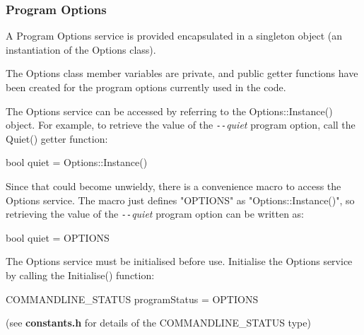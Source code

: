 \subsubsection{Program Options}\label{sec:Services_OPTIONS}

A Program Options service is provided encapsulated in a singleton object (an instantiation of the Options class).

The Options class member variables are private, and public getter functions have been created for the program options currently used in the code.

The Options service can be accessed by referring to the Options::Instance() object.  For example, to retrieve the value of the \textit{\texttt{-{}-}quiet} program option, call the Quiet() getter function:

\tabto{3em}bool quiet = Options::Instance()

\medskip
Since that could become unwieldy, there is a convenience macro to access the Options service.  The macro just defines "OPTIONS" as "Options::Instance()", so retrieving the value of the \textit{\texttt{-{}-}quiet} program option can be written as:

\tabto{3em}bool quiet = OPTIONS

\medskip
The Options service must be initialised before use.  Initialise the Options service by calling the Initialise() function:

\tabto{3em}COMMANDLINE\_STATUS programStatus = OPTIONS

(see \textbf{constants.h} for details of the COMMANDLINE\_STATUS type)
